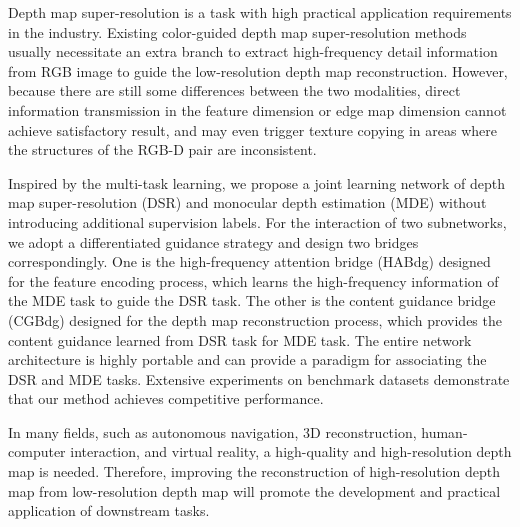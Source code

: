 \begin{englishabstract}
	 Depth map super-resolution is a task with high practical application requirements in the industry. Existing color-guided depth map super-resolution methods usually necessitate an extra branch to extract high-frequency detail information from RGB image to guide the low-resolution depth map reconstruction. However, because there are still some differences between the two modalities, direct information transmission in the feature dimension or edge map dimension cannot achieve satisfactory result, and may even trigger texture copying in areas where the structures of the RGB-D pair are inconsistent.
	
Inspired by the multi-task learning, we propose a joint learning network of depth map super-resolution (DSR) and monocular depth estimation (MDE) without introducing additional supervision labels. For the interaction of two subnetworks, we adopt a differentiated guidance strategy and design two bridges correspondingly. One is the high-frequency attention bridge (HABdg) designed for the feature encoding process, which learns the high-frequency information of the MDE task to guide the DSR task. The other is the content guidance bridge (CGBdg) designed for the depth map reconstruction process, which provides the content guidance learned from DSR task for MDE task. The entire network architecture is highly portable and can provide a paradigm for associating the DSR and MDE tasks. Extensive experiments on benchmark datasets demonstrate that our method achieves competitive performance.

In many fields, such as autonomous navigation, 3D reconstruction, human-computer interaction, and virtual reality, a high-quality and high-resolution depth map is needed. Therefore, improving the reconstruction of high-resolution depth map from low-resolution depth map will promote the development and practical application of downstream tasks.
	\newline		
	\newline
\end{englishabstract}